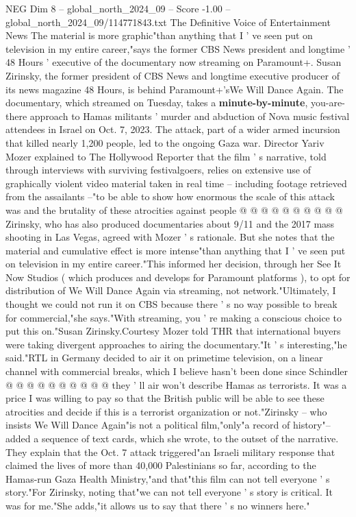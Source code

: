 \begin{textsample}{NEG Dim 8 – global\_north\_2024\_09 – Score -1.00 – global\_north\_2024\_09/114771843.txt}  \label{ex:f8_neg_150}
The Definitive Voice of Entertainment News The material is more graphic"than anything that I ' ve seen put on television in my entire career,"says the former CBS News president and longtime ' 48 Hours ' executive of the documentary now streaming on Paramount+.
Susan Zirinsky, the former president of CBS News and longtime executive producer of its news magazine 48 Hours, is behind Paramount+'sWe Will Dance Again.
The documentary, which streamed on Tuesday, takes a \textbf{minute-by-minute}, you-are-there approach to Hamas militants ' murder and abduction of Nova music festival attendees in Israel on Oct. 7, 2023.
The attack, part of a wider armed incursion that killed nearly 1,200 people, led to the ongoing Gaza war.
Director Yariv Mozer explained to The Hollywood Reporter that the film ' s narrative, told through interviews with surviving festivalgoers, relies on extensive use of graphically violent video material taken in real time -- including footage retrieved from the assailants --"to be able to show how enormous the scale of this attack was and the brutality of these atrocities against people @ @ @ @ @ @ @ @ @ @ Zirinsky, who has also produced documentaries about 9/11 and the 2017 mass shooting in Las Vegas, agreed with Mozer ' s rationale.
But she notes that the material and cumulative effect is more intense"than anything that I ' ve seen put on television in my entire career."This informed her decision, through her See It Now Studios ( which produces and develops for Paramount platforms ), to opt for distribution of We Will Dance Again via streaming, not network."Ultimately, I thought we could not run it on CBS because there ' s no way possible to break for commercial,"she says."With streaming, you ' re making a conscious choice to put this on."Susan Zirinsky.Courtesy Mozer told THR that international buyers were taking divergent approaches to airing the documentary."It ' s interesting,"he said."RTL in Germany decided to air it on primetime television, on a linear channel with commercial breaks, which I believe hasn't been done since Schindler @ @ @ @ @ @ @ @ @ @ they ' ll air won't describe Hamas as terrorists.
It was a price I was willing to pay so that the British public will be able to see these atrocities and decide if this is a terrorist organization or not."Zirinsky -- who insists We Will Dance Again"is not a political film,"only"a record of history"-- added a sequence of text cards, which she wrote, to the outset of the narrative.
They explain that the Oct. 7 attack triggered"an Israeli military response that claimed the lives of more than 40,000 Palestinians so far, according to the Hamas-run Gaza Health Ministry,"and that"this film can not tell everyone ' s story."For Zirinsky, noting that"we can not tell everyone ' s story is critical.
It was for me."She adds,"it allows us to say that there ' s no winners here."

\end{textsample}
